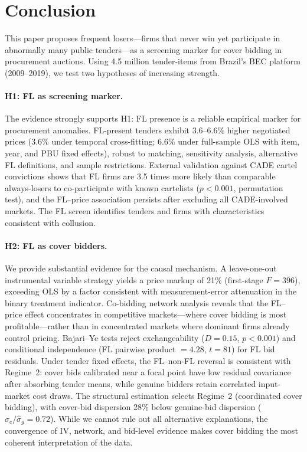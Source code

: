 \section{Conclusion}
\label{sec:conclusion}

This paper proposes frequent losers---firms that never win yet
participate in abnormally many public tenders---as a screening marker for
cover bidding in procurement auctions. Using 4.5 million tender-items
from Brazil's BEC platform (2009--2019), we test two hypotheses of
increasing strength.

\paragraph{H1: FL as screening marker.}
The evidence strongly supports H1: FL presence is a reliable empirical %
marker for procurement anomalies. FL-present tenders exhibit
3.6--6.6\% higher negotiated prices (3.6\% under temporal
cross-fitting; 6.6\% under full-sample OLS with item, year, and PBU
fixed effects), robust to matching, sensitivity analysis, alternative
FL definitions, and sample restrictions. External validation against
CADE cartel convictions shows that FL firms are 3.5 times more likely
than comparable always-losers to co-participate with known cartelists
($p < 0.001$, permutation test), and the FL--price association
persists after excluding all CADE-involved markets. The FL screen
identifies tenders and firms with characteristics consistent with
collusion.

\paragraph{H2: FL as cover bidders.}
We provide substantial evidence for the causal mechanism. A leave-one-out
instrumental variable strategy yields a price markup of 21\%
(first-stage $F = 396$), exceeding OLS by a factor consistent with
measurement-error attenuation in the binary treatment indicator.
Co-bidding network analysis reveals that the FL--price effect
concentrates in competitive markets---where cover bidding is most
profitable---rather than in concentrated markets where dominant firms
already control pricing. Bajari--Ye tests reject exchangeability ($D = 0.15$, $p < 0.001$) %
and conditional independence (FL pairwise product $= 4.28$,
$t = 81$) for FL bid residuals. Under tender fixed effects, the
FL--non-FL reversal is consistent with Regime~2: cover bids
calibrated near a focal point have low residual covariance after
absorbing tender means, while genuine bidders retain correlated
input-market cost draws. The structural estimation selects
Regime~2 (coordinated cover bidding), with cover-bid dispersion
28\% below genuine-bid dispersion
($\hat{\sigma}_c / \hat{\sigma}_g = 0.72$).
While we cannot rule out all alternative explanations, the convergence
of IV, network, and bid-level evidence makes cover bidding the most
coherent interpretation of the data.

